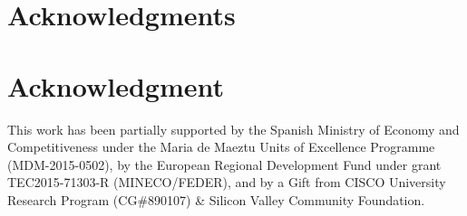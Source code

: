 \documentclass[10pt,journal,compsoc]{IEEEtran}
\begin{document}
	\ifCLASSOPTIONcompsoc
	\section*{Acknowledgments}
	\else
	\section*{Acknowledgment}
	\fi
	This work has been partially supported by the Spanish Ministry of Economy and Competitiveness under the Maria de Maeztu Units of Excellence Programme (MDM-2015-0502), by the European Regional Development Fund under grant TEC2015-71303-R (MINECO/FEDER), and by a Gift from CISCO University Research Program (CG\#890107) \& Silicon Valley Community Foundation.
			
	
	
\end{document}
